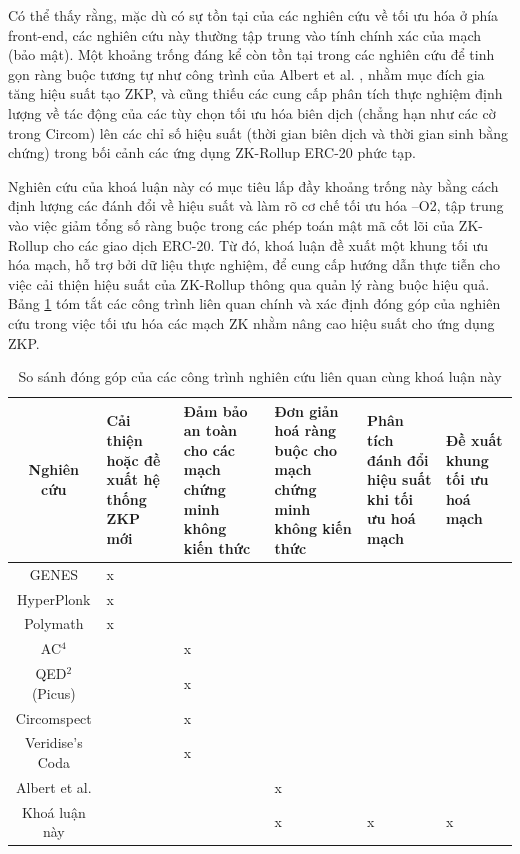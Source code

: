 Có thể thấy rằng, mặc dù có sự tồn tại của các nghiên cứu về tối ưu hóa ở phía front-end, các nghiên cứu này thường tập trung vào tính chính xác của mạch (bảo mật). Một khoảng trống đáng kể còn tồn tại trong các nghiên cứu để tinh gọn ràng buộc tương tự như công trình của Albert et al. \cite{albert2022distilling}, nhằm mục đích gia tăng hiệu suất tạo ZKP, và cũng thiếu các cung cấp phân tích thực nghiệm định lượng về tác động của các tùy chọn tối ưu hóa biên dịch (chẳng hạn như các cờ trong Circom) lên các chỉ số hiệu suất (thời gian biên dịch và thời gian sinh bằng chứng) trong bối cảnh các ứng dụng ZK-Rollup ERC-20 phức tạp.

Nghiên cứu của khoá luận này có mục tiêu lấp đầy khoảng trống này bằng cách định lượng các đánh đổi về hiệu suất và làm rõ cơ chế tối ưu hóa --O2, tập trung vào việc giảm tổng số ràng buộc trong các phép toán mật mã cốt lõi của ZK-Rollup cho các giao dịch ERC-20. Từ đó, khoá luận đề xuất một khung tối ưu hóa mạch, hỗ trợ bởi dữ liệu thực nghiệm, để cung cấp hướng dẫn thực tiễn cho việc cải thiện hiệu suất của ZK-Rollup thông qua quản lý ràng buộc hiệu quả. Bảng \ref{tab:related_work_contributions} tóm tắt các công trình liên quan chính và xác định đóng góp của nghiên cứu trong việc tối ưu hóa các mạch ZK nhằm nâng cao hiệu suất cho ứng dụng ZKP.

\begin{table}[h]
    \centering
    \begin{tabularx}{\textwidth}{|c|>{\centering\arraybackslash}X|>{\centering\arraybackslash}X|>{\centering\arraybackslash}X|>{\centering\arraybackslash}X|>{\centering\arraybackslash}X|}
        \hline
        \textbf{Nghiên cứu} & \textbf{Cải thiện hoặc đề xuất hệ thống ZKP mới} &
        \textbf{Đảm bảo an toàn cho các mạch chứng minh không kiến thức} & \textbf{Đơn giản hoá ràng buộc cho mạch chứng minh không kiến thức} & \textbf{Phân tích đánh đổi hiệu suất khi tối ưu hoá mạch} & \textbf{Đề xuất khung tối ưu hoá mạch} \\ 
        \hline
        GENES \cite{liu2025genes} & x &  &  &  &  \\ \hline
        HyperPlonk \cite{chen2023hyperplonk} & x &  &  &  &  \\ \hline
        Polymath \cite{lipmaa2024polymath} & x &  &  &  &  \\ \hline
        AC$^4$ \cite{chen2024ac4} &  & x &  &  &  \\ \hline
        QED$^2$ (Picus) \cite{pailoor2023automated} &  & x &  &  &  \\ \hline
        Circomspect \cite{circomspect2022} &  & x &  &  &  \\ \hline
        Veridise’s Coda \cite{liu2024certifying} &  & x &  &  &  \\ \hline
        Albert et al. \cite{albert2022distilling} &  &  & x &  &  \\ \hline
        Khoá luận này &  &  & x & x & x \\
        \hline
    \end{tabularx}
    \caption{So sánh đóng góp của các công trình nghiên cứu liên quan cùng khoá luận này}
    \label{tab:related_work_contributions}
\end{table}

